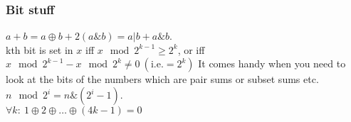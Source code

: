\documentclass[
	a4paper,
	landscape,
	10pt,
]{article}
\begin{document}
		\subsubsection*{Bit stuff} $a + b = a \oplus b + 2(a\&b) = a | b + a\&b$. \\
		kth bit is set in $x$ iff $x \mod 2^{k-1} \geq 2^k$, or iff $x \mod 2^{k-1}  - x \mod 2^k \neq 0~(\text{i.e.} = 2^k)$ It comes handy when you need to look at the bits of the numbers which are pair sums or subset sums etc. \\
		$n \mod 2^i = n\&(2^i-1)$. \\
		$\forall k:~ 1 \oplus 2 \oplus \hdots \oplus (4k-1) = 0$
\end{document}
